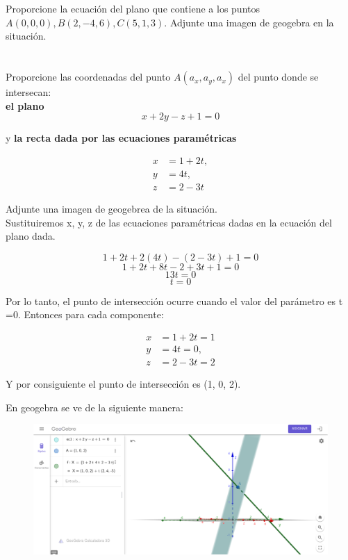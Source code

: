 \documentclass[12pt]{article}
\begin{document}
\section{}

Proporcione la ecuación del plano que contiene a los puntos $A(0,0,0) , B(2,-4,6), C(5,1,3)$. Adjunte una imagen de geogebra en la situación.

\section{}

Proporcione las coordenadas del punto $A(a_x,a_y,a_x)$ del punto donde se intersecan: \\

\textbf{el plano} \\

\[ x + 2y -z+1 =0 \]

y \textbf{la recta dada por las ecuaciones paramétricas}

\begin{align*}
  x &= 1 + 2t,\\
  y &=4t,\\
  z &= 2 - 3t
\end{align*}

Adjunte una imagen de geogebrea de la situación. \\

Sustituiremos x, y, z de las ecuaciones paramétricas dadas en la ecuación del plano dada.

\[ 1 + 2t + 2(4t) - (2-3t)+1 =0 \]
\[ 1 + 2t + 8t - 2+3t +1 =0 \]
\[  13t =0 \]
\[ t = 0\]

Por lo tanto, el punto de intersección ocurre cuando el valor del parámetro es t =0.
Entonces para cada componente:

\begin{align*}
  x &= 1 + 2t = 1\\
  y &=4t = 0,\\
  z &= 2 - 3t = 2 
\end{align*}

Y por consiguiente el punto de intersección es (1, 0, 2).

En geogebra se ve de la siguiente manera:

\begin{figure}[H]
  \centering
  \includegraphics[width=1\textwidth]{./img/interPlano.png}
\end{figure}
\end{document}
